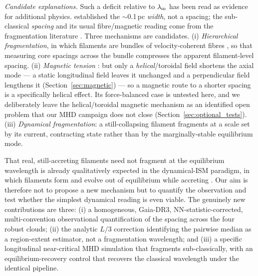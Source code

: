 \documentclass[usenatbib,twoside,twocolumn]{mnras}
\begin{document}
\emph{Candidate explanations.} Such a deficit relative to $\lambda_{\rm m}$ has been read as evidence for additional physics. \citet{Arzoumanian2019} established the $\sim$0.1\,pc \emph{width}, not a spacing; the sub-classical \emph{spacing} and its usual fibre/magnetic reading come from the fragmentation literature \citep{Fischera2012,Zhang2023cal}. Three mechanisms are candidates. (i) \emph{Hierarchical fragmentation}, in which filaments are bundles of velocity-coherent fibres \citep{Hacar2013,Hacar2018,Yang2024}, so that measuring core spacings across the bundle compresses the apparent filament-level spacing. (ii) \emph{Magnetic tension} \citep{Nakamura1993}: but only a \emph{helical}/toroidal field shortens the axial mode --- a static longitudinal field leaves it unchanged and a perpendicular field lengthens it (Section~\ref{sec:magnetic}) --- so a magnetic route to a shorter spacing is a specifically helical effect. Its force-balanced case is untested here, and we deliberately leave the helical/toroidal magnetic mechanism as an identified open problem that our MHD campaign does not close (Section~\ref{sec:optional_tests}). (iii) \emph{Dynamical fragmentation}: a still-collapsing filament fragments at a scale set by its current, contracting state rather than by the marginally-stable equilibrium mode.

That real, still-accreting filaments need not fragment at the equilibrium wavelength is already qualitatively expected in the dynamical-ISM paradigm, in which filaments form and evolve out of equilibrium while accreting \citep{Andre2014,Clarke2016,Clarke2017,Clarke2020}. Our aim is therefore not to propose a new mechanism but to quantify the observation and test whether the simplest dynamical reading is even viable. The genuinely new contributions are three: (i) a homogeneous, Gaia-DR3, NN-statistic-corrected, multi-convention observational quantification of the spacing across the four robust clouds; (ii) the analytic $L/3$ correction identifying the pairwise median as a region-extent estimator, not a fragmentation wavelength; and (iii) a specific longitudinal near-critical MHD simulation that fragments sub-classically, with an equilibrium-recovery control that recovers the classical wavelength under the identical pipeline.
\end{document}
